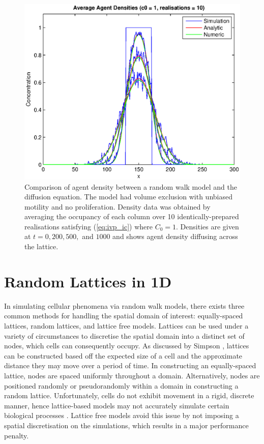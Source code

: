 \documentclass[11pt,titlepage,a4paper]{article}
\begin{document}
		\begin{figure}[tbh]
			\centering
				\includegraphics[width=\textwidth]{./Figures/cell_concentration_1_10.eps}
			\caption{Comparison of agent density between a random walk model and the diffusion equation. The model had volume exclusion with unbiased motility and no proliferation. Density data was obtained by averaging the occupancy of each column over 10 identically-prepared realisations satisfying (\ref{eq:ivp_ic}) where $C_0 = 1$. Densities are given at $t = 0, 200, 500,$ and $1000$ and shows agent density diffusing across the lattice.}
			\label{fig:cell_concentration_1_10}
		\end{figure}
	


\section{Random Lattices in 1D}
	\label{sec:randlatticein1d}
	
	In simulating cellular phenomena via random walk models, there exists three common methods for handling the spatial domain of interest: equally-spaced lattices, random lattices, and lattice free models. Lattices can be used under a variety of circumstances to discretise the spatial domain into a distinct set of nodes, which cells can consequently occupy. As discussed by Simpson \cite{simpson2010cell}, lattices can be constructed based off the expected size of a cell and the approximate distance they may move over a period of time. In constructing an equally-spaced lattice, nodes are spaced uniformly throughout a domain. Alternatively, nodes are positioned randomly or pseudorandomly within a domain in constructing a random lattice. Unfortunately, cells do not exhibit movement in a rigid, discrete manner, hence lattice-based models may not accurately simulate certain biological processes \cite{plank2013lattice}. Lattice free models avoid this issue by not imposing a spatial discretisation on the simulations, which results in a major performance penalty. 
\end{document}

